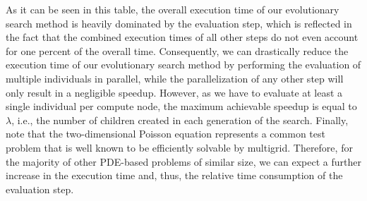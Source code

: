 As it can be seen in this table, the overall execution time of our evolutionary search method is heavily dominated by the evaluation step, which is reflected in the fact that the combined execution times of all other steps do not even account for one percent of the overall time.
Consequently, we can drastically reduce the execution time of our evolutionary search method by performing the evaluation of multiple individuals in parallel, while the parallelization of any other step will only result in a negligible speedup. 
However, as we have to evaluate at least a single individual per compute node, the maximum achievable speedup is equal to $\lambda$, i.e., the number of children created in each generation of the search.
Finally, note that the two-dimensional Poisson equation represents a common test problem that is well known to be efficiently solvable by multigrid.
Therefore, for the majority of other PDE-based problems of similar size, we can expect a further increase in the execution time and, thus, the relative time consumption of the evaluation step.

